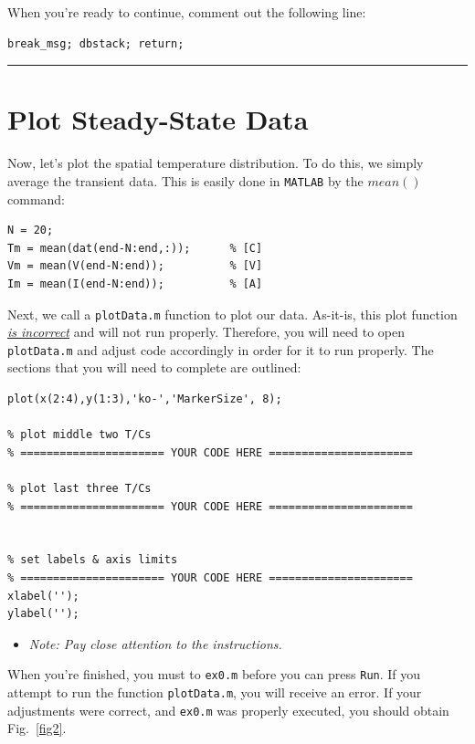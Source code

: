 \documentclass[11pt, letterpaper]{article}
\begin{document}
When you're ready to continue, comment out the following line:

\n
\begin{lstlisting}[numbers=none]
% remove break
break_msg; dbstack; return;
\end{lstlisting}

\n
\hrule

\section{Plot Steady-State Data}

Now, let's plot the spatial temperature distribution. To do this, we simply average the transient data. This is easily done in \texttt{MATLAB} by the $mean( )$ command:

\begin{lstlisting}[numbers=none]
% take an average of the last (~20) points 
N = 20;
Tm = mean(dat(end-N:end,:));      % [C]
Vm = mean(V(end-N:end));          % [V]
Im = mean(I(end-N:end));          % [A]
\end{lstlisting}

Next, we call a \texttt{plotData.m} function to plot our data. As-it-is, this plot function \textit{\ul{is incorrect}} and will not run properly. Therefore, you will need to open \texttt{plotData.m} and adjust code accordingly in order for it to run properly. The sections that you will need to complete are outlined:

\n
\begin{lstlisting}[numbers=none]
% plot first three T/Cs
plot(x(2:4),y(1:3),'ko-','MarkerSize', 8);

% plot middle two T/Cs
% ====================== YOUR CODE HERE ======================

% plot last three T/Cs
% ====================== YOUR CODE HERE ======================


% set labels & axis limits
% ====================== YOUR CODE HERE ======================
xlabel('');
ylabel('');
\end{lstlisting}

\begin{itemize}
    \item \textit{Note: Pay close attention to the instructions.}
\end{itemize}

When you're finished, you must  to \texttt{ex0.m} before you can press \texttt{Run}. If you attempt to run the function \texttt{plotData.m}, you will receive an error. If your adjustments were correct, and \texttt{ex0.m} was properly executed, you should obtain Fig.~\ref{fig2}.
\end{document}

